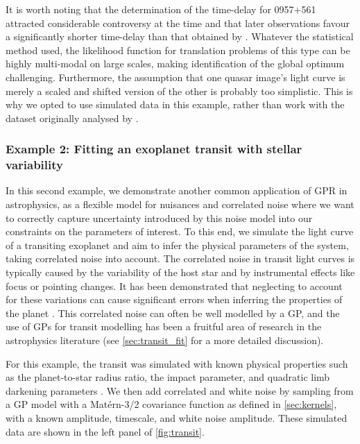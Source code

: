 \documentclass[letterpaper]{ar-1col}
\begin{document}
It is worth noting that the determination of the time-delay for 0957+561 attracted considerable controversy at the time \citep[see][and references therein]{1995ApJ...455L...5K} and that later observations \citep{1997ApJ...482...75K} favour a significantly shorter time-delay than that obtained by \citet{prh92a}. Whatever the statistical method used, 
the likelihood function for translation problems of this type can be highly multi-modal on large scales, making identification of the global optimum challenging. Furthermore, the assumption that one quasar image's light curve is merely a scaled and shifted version of the other is probably too simplistic. This is why we opted to use simulated data in this example, rather than work with the  dataset originally analysed by \citet{prh92a}.


\subsubsection{Example 2: Fitting an exoplanet transit with stellar variability}
\label{sec:transit}

In this second example, we demonstrate another common application of GPR in astrophysics, as a flexible model for nuisances and correlated noise where we want to correctly capture uncertainty introduced by this noise model into our constraints on the parameters of interest.
To this end, we simulate the light curve of a transiting exoplanet and aim to infer the physical parameters of the system, taking correlated noise into account.
The correlated noise in transit light curves is typically caused by the variability of the host star and by instrumental effects like focus or pointing changes.
It has been demonstrated that neglecting to account for these variations can cause significant errors when inferring the properties of the planet \citep{2006MNRAS.373..231P,2007A&A...472L..13G}.
This correlated noise can often be well modelled by a GP, and the use of GPs for transit modelling has been a fruitful area of research in the astrophysics literature (see \autoref{sec:transit_fit} for a more detailed discussion).

For this example, the transit was simulated with known physical properties such as the planet-to-star radius ratio, the impact parameter, and quadratic limb darkening parameters \citep{2020AJ....159..123A}.
We then add correlated and white noise by sampling from a GP model with a Mat\'ern-3/2 covariance function as defined in \autoref{sec:kernels}, with a known amplitude, timescale, and white noise amplitude.
These simulated data are shown in the left panel of \autoref{fig:transit}.
\end{document}
